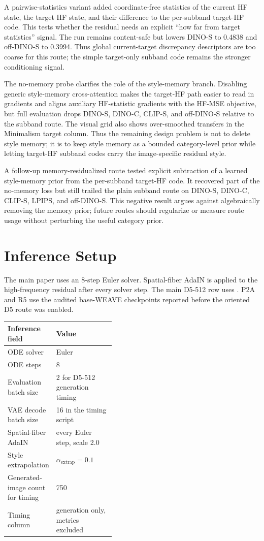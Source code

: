 \documentclass[10pt,twocolumn]{article}
\newcommand{\dinos}{DINO-S}
\newcommand{\dinoc}{DINO-C}
\newcommand{\clips}{CLIP-S}
\begin{document}
A pairwise-statistics variant added coordinate-free statistics of the current HF state,
the target HF state, and their difference to the per-subband target-HF code. This tests
whether the residual needs an explicit ``how far from target statistics'' signal.
The run remains content-safe but lowers \dinos{} to 0.4838 and off-\dinos{} to 0.3994.
Thus global current-target discrepancy descriptors are too coarse for this route; the
simple target-only subband code remains the stronger conditioning signal.

The no-memory probe clarifies the role of the style-memory branch. Disabling generic
style-memory cross-attention makes the target-HF path easier to read in gradients and
aligns auxiliary HF-statistic gradients with the HF-MSE objective, but full evaluation
drops \dinos{}, \dinoc{}, \clips{}, and off-\dinos{} relative to the subband route.
The visual grid also shows over-smoothed transfers in the Minimalism target column.
Thus the remaining design problem is not to delete style memory; it is to keep style
memory as a bounded category-level prior while letting target-HF subband codes carry
the image-specific residual style.

A follow-up memory-residualized route tested explicit subtraction of a learned
style-memory prior from the per-subband target-HF code. It recovered part of the
no-memory loss but still trailed the plain subband route on \dinos{}, \dinoc{},
\clips{}, LPIPS, and off-\dinos{}. This negative result argues against algebraically
removing the memory prior; future routes should regularize or measure route usage
without perturbing the useful category prior.

\section{Inference Setup}

The main paper uses an 8-step Euler solver. Spatial-fiber AdaIN is applied to the
high-frequency residual after every solver step. The main D5-512 row uses
. P2A and R5 use the
audited base-WEAVE checkpoints reported before the oriented D5 route was enabled.

\begin{center}
\footnotesize
\begin{tabularx}{\linewidth}{p{0.42\linewidth}X}
\toprule
Inference field & Value \\
\midrule
ODE solver & Euler \\
ODE steps & 8 \\
Evaluation batch size & 2 for D5-512 generation timing \\
VAE decode batch size & 16 in the timing script \\
Spatial-fiber AdaIN & every Euler step, scale 2.0 \\
Style extrapolation & \(\alpha_{\mathrm{extrap}}=0.1\) \\
Generated-image count for timing & 750 \\
Timing column & generation only, metrics excluded \\
\bottomrule
\end{tabularx}
\normalsize
\end{center}
\end{document}
